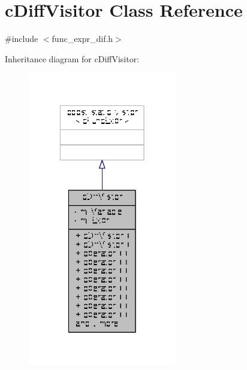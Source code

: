 \hypertarget{classcDiffVisitor}{\section{c\-Diff\-Visitor Class Reference}
\label{classcDiffVisitor}
}


{\ttfamily \#include $<$func\-\_\-expr\-\_\-dif.\-h$>$}



Inheritance diagram for c\-Diff\-Visitor\-:
\nopagebreak
\begin{figure}[H]
\begin{center}
\leavevmode
\includegraphics[width=184pt]{classcDiffVisitor__inherit__graph}
\end{center}
\end{figure}


